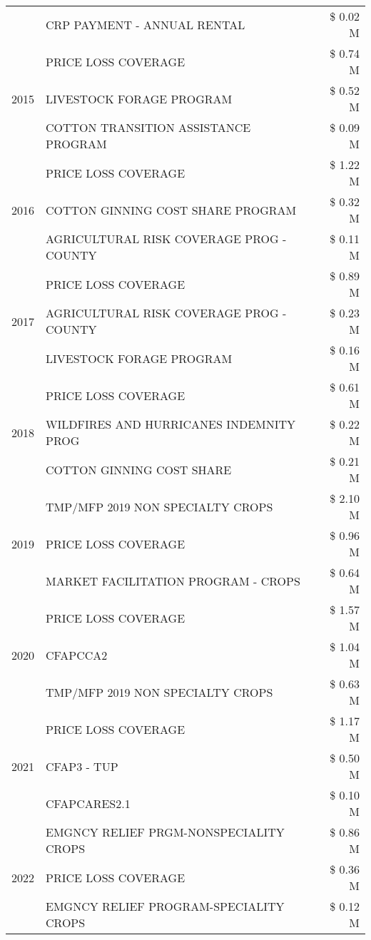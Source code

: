 \begin{tabular}{llr}
 & CRP PAYMENT - ANNUAL RENTAL & \$ 0.02 M \\
\cline{1-3}
\multirow[t]{3}{*}{2015} & PRICE LOSS COVERAGE & \$ 0.74 M \\
 & LIVESTOCK FORAGE PROGRAM & \$ 0.52 M \\
 & COTTON TRANSITION ASSISTANCE PROGRAM & \$ 0.09 M \\
\cline{1-3}
\multirow[t]{3}{*}{2016} & PRICE LOSS COVERAGE & \$ 1.22 M \\
 & COTTON GINNING COST SHARE PROGRAM & \$ 0.32 M \\
 & AGRICULTURAL RISK COVERAGE PROG - COUNTY & \$ 0.11 M \\
\cline{1-3}
\multirow[t]{3}{*}{2017} & PRICE LOSS COVERAGE & \$ 0.89 M \\
 & AGRICULTURAL RISK COVERAGE PROG - COUNTY & \$ 0.23 M \\
 & LIVESTOCK FORAGE PROGRAM & \$ 0.16 M \\
\cline{1-3}
\multirow[t]{3}{*}{2018} & PRICE LOSS COVERAGE & \$ 0.61 M \\
 & WILDFIRES AND HURRICANES INDEMNITY PROG & \$ 0.22 M \\
 & COTTON GINNING COST SHARE & \$ 0.21 M \\
\cline{1-3}
\multirow[t]{3}{*}{2019} & TMP/MFP 2019 NON SPECIALTY CROPS & \$ 2.10 M \\
 & PRICE LOSS COVERAGE & \$ 0.96 M \\
 & MARKET FACILITATION PROGRAM - CROPS & \$ 0.64 M \\
\cline{1-3}
\multirow[t]{3}{*}{2020} & PRICE LOSS COVERAGE & \$ 1.57 M \\
 & CFAPCCA2 & \$ 1.04 M \\
 & TMP/MFP 2019 NON SPECIALTY CROPS & \$ 0.63 M \\
\cline{1-3}
\multirow[t]{3}{*}{2021} & PRICE LOSS COVERAGE & \$ 1.17 M \\
 & CFAP3 - TUP & \$ 0.50 M \\
 & CFAPCARES2.1 & \$ 0.10 M \\
\cline{1-3}
\multirow[t]{3}{*}{2022} & EMGNCY RELIEF PRGM-NONSPECIALITY CROPS & \$ 0.86 M \\
 & PRICE LOSS COVERAGE & \$ 0.36 M \\
 & EMGNCY RELIEF PROGRAM-SPECIALITY CROPS & \$ 0.12 M \\
\cline{1-3}
\bottomrule
\end{tabular}
